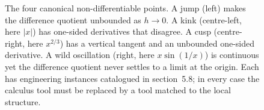 \begin{figure}[ht]
\begin{tikzpicture}[x=1cm, y=1cm, font=\small]
\end{tikzpicture}
\caption[Four ways differentiability fails]{The four canonical
non-differentiable points. A jump (left) makes the difference
quotient unbounded as $h\to 0$. A kink (centre-left, here $|x|$) has
one-sided derivatives that disagree. A cusp (centre-right, here
$x^{2/3}$) has a vertical tangent and an unbounded one-sided
derivative. A wild oscillation (right, here $x\sin(1/x)$) is
continuous yet the difference quotient never settles to a limit at
the origin. Each has engineering instances catalogued in
section~5.8; in every case the calculus tool must be replaced by a
tool matched to the local structure.}
\label{fig:vol02:ch05:nondifferentiable}
\end{figure}
